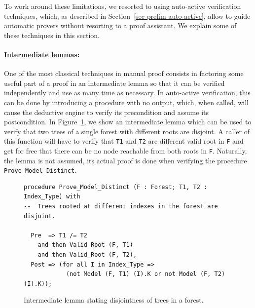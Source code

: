 \documentclass[11pt,a4paper]{article}
\begin{document}
To work around these limitations, we resorted to using auto-active verification techniques, which,
as described in Section~\ref{sec-prelim-auto-active}, allow to guide automatic provers without
resorting to a proof assistant. We explain some of these techniques in this section.

\paragraph{Intermediate lemmas:}
One of the most classical techniques in manual proof consists in factoring some useful
part of a proof in an intermediate lemma so that it can be verified independently and
use as many time as necessary. In auto-active verification, this can be done by introducing
a procedure with no output, which, when called, will cause the deductive engine to verify
its precondition and assume its postcondition. In Figure~\ref{fig-proof-lem}, we show an
intermediate lemma which can be used to verify that two trees of a single forest with different
roots are disjoint. A caller of this function will have to verify that \texttt{T1} and \texttt{T2} are different
valid root in \texttt{F} and get for free that there can be no node reachable from both roots in \texttt{F}.
Naturally, the lemma is not assumed, its actual proof is done when verifying the procedure
\texttt{Prove\_Model\_Distinct}.

\begin{figure}
\begin{small}
\begin{lstlisting}
procedure Prove_Model_Distinct (F : Forest; T1, T2 : Index_Type) with
--  Trees rooted at different indexes in the forest are disjoint.

  Pre  => T1 /= T2
    and then Valid_Root (F, T1)
    and then Valid_Root (F, T2),
  Post => (for all I in Index_Type =>
            (not Model (F, T1) (I).K or not Model (F, T2) (I).K));
\end{lstlisting}
\end{small}
\caption{\label{fig-proof-lem} Intermediate lemma stating disjointness of trees in a forest.}
\end{figure}
\end{document}

